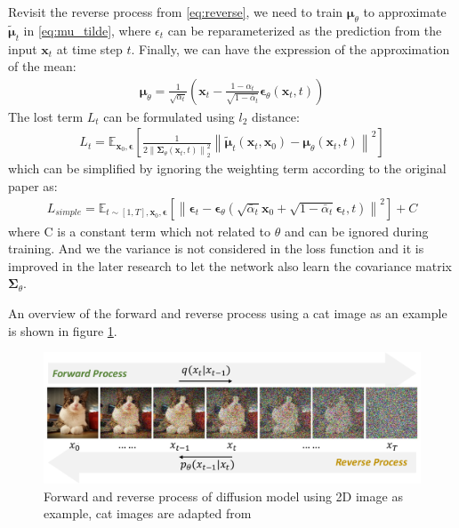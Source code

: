 \documentclass[12pt,DIV14,BCOR12mm,a4paper,footinclude=false,headinclude,parskip=half-,twoside,openright,cleardoublepage=empty,toc=index,bibliography=totoc,listof=totoc]{scrreprt}
\numberwithin{equation}{chapter}
\begin{document}
Revisit the reverse process from \ref{eq:reverse}, we need to train $\boldsymbol{\mu}_{\theta}$ to approximate $\boldsymbol{\tilde{\mu}}_{t}$ in \ref{eq:mu_tilde}, where $\epsilon_{t}$ can be reparameterized as the prediction from the input $\mathbf{x}_{t}$ at time step $t$. Finally, we can have the expression of the approximation of the mean:
\begin{align}
  \boldsymbol{\mu}_{\theta} = \frac{1}{\sqrt{\alpha_{t}}}\left(\mathbf{x}_{t} - \frac{1-\alpha_{t}}{\sqrt{1-\bar{\alpha}_{t}}}\boldsymbol{\epsilon}_{\theta}(\mathbf{x}_{t}, t)\right)
\end{align}
The lost term $L_{t}$ can be formulated using $l_{2}$ distance:
\begin{align}
  L_{t} = \mathbb{E}_{\mathbf{x}_{0},\boldsymbol{\epsilon}}\left[\frac{1}{2 \left\lVert \mathbf{\Sigma}_{\theta}(\mathbf{x}_{t},t)\right\rVert_{2}^{2}}\left\lVert\boldsymbol{\tilde{\mu}}_{t}(\mathbf{x}_{t},\mathbf{x}_{0}) - \boldsymbol{\mu}_{\theta}(\mathbf{x}_{t},t) \right\rVert ^{2}\right]
\end{align}
which can be simplified by ignoring the weighting term according to the original paper \cite{ho2020denoising} as:
\begin{align}
  L_{simple} = \mathbb{E}_{t\sim[1,T],\mathbf{x}_{0},\boldsymbol{\epsilon}}\left[\left\lVert\boldsymbol{\epsilon}_{t} - \boldsymbol{\epsilon}_{\theta}(\sqrt{\bar{\alpha}_{t}}\mathbf{x}_{0} + \sqrt{1 - \bar{\alpha}_{t}}\boldsymbol{\epsilon}_{t}, t)\right\rVert ^{2}\right] + C
\end{align}
where C is a constant term which not related to $\theta$ and can be ignored during training.  And we the variance is not considered in the loss function and it is improved in the later research \cite{nichol2021improved} to let the network also learn the covariance matrix $\mathbf{\Sigma}_{\theta}$.

An overview of the forward and reverse process using a cat image as an example is shown in figure \ref{img:diff_process}.
\begin{figure}[h]
	\centering
	\includegraphics[width=1.0\textwidth]{img/diff_process.pdf}
	\caption{Forward and reverse process of diffusion model using 2D image as example, cat images are adapted from \cite{xiao2022DDGAN}}
	\label{img:diff_process}
\end{figure}
\end{document}
